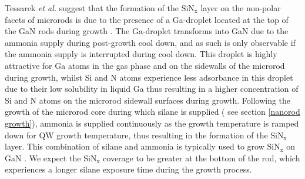 Tessarek \textit{et al.} suggest that the formation of the $\mathrm{SiN_{x}}$ layer on the non-polar facets of microrods is due to the presence of a Ga-droplet located at the top of the GaN rods during growth \cite{Tessarek2014a}. The Ga-droplet transforms into GaN due to the ammonia supply during post-growth cool down, and as such is only observable if the ammonia supply is interrupted during cool down. This droplet is highly attractive for Ga atoms in the gas phase and on the sidewalls of the microrod during growth, whilst Si and N atoms experience less adsorbance in this droplet due to their low solubility in liquid Ga \cite{Unland2003,Schmidt2010} thus resulting in a higher concentration of Si and N atoms on the microrod sidewall surfaces during growth. Following the growth of the microrod core during which silane is supplied ( see section \ref{nanorod growth}), ammonia is supplied continuously as the growth temperature is ramped down for QW growth temperature, thus resulting in the formation of the $\mathrm{SiN_{x}}$ layer. This combination of silane and ammonia is typically used to grow $\mathrm{SiN_{x}}$ on GaN \cite{Bottcher2003}. We expect the $\mathrm{SiN_{x}}$ coverage to be greater at the bottom of the rod, which experiences a longer silane exposure time during the growth process.

